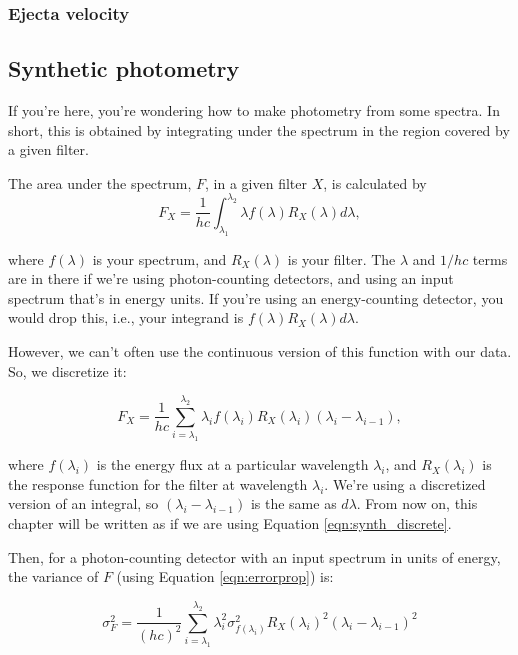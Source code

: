 \subsubsection{Ejecta velocity}
\label{sec:ejectavelocity}

\subsection{Synthetic photometry}

If you're here, you're wondering how to make photometry from some spectra. In short, this is obtained by integrating under the spectrum in the region covered by a given filter. 

The area under the spectrum, $F$, in a given filter $X$, is calculated by
\begin{equation}
    F_{X} = \frac{1}{hc}\int_{\lambda_{1}}^{\lambda_{2}} \lambda f(\lambda) R_{X}(\lambda) d\lambda,
\label{eqn:synthint}
\end{equation}

where $f(\lambda)$ is your spectrum, and $R_{X}(\lambda)$ is your filter. The $\lambda$ and $1/hc$ terms are in there if we're using photon-counting detectors, and using an input spectrum that's in energy units. If you're using an energy-counting detector, you would drop this, i.e., your integrand is $f(\lambda) R_{X}(\lambda) d\lambda$.

However, we can't often use the continuous version of this function with our data. So, we discretize it:

\begin{equation}
    F_{X} = \frac{1}{hc}\sum_{i=\lambda_{1}}^{\lambda_{2}} \lambda_{i} f(\lambda_{i}) R_{X}(\lambda_{i})(\lambda_{i} - \lambda_{i-1}),
\label{eqn:synth_discrete}
\end{equation}

where $f(\lambda_{i})$ is the energy flux at a particular wavelength $\lambda_{i}$, and $R_{X}(\lambda_{i})$ is the response function for the filter at wavelength $\lambda_{i}$. We're using a discretized version of an integral, so $(\lambda_{i} - \lambda_{i-1})$ is the same as $d\lambda$. From now on, this chapter will be written as if we are using Equation \ref{eqn:synth_discrete}.

Then, for a photon-counting detector with an input spectrum in units of energy, the variance of $F$ (using Equation \ref{eqn:errorprop}) is:

\begin{equation}
\label{eqn:varphot}
    \sigma_{F}^{2} = \frac{1}{(hc)^{2}}\sum_{i=\lambda_{1}}^{\lambda_{2}} \lambda_{i}^{2}\sigma_{f(\lambda_{i})}^{2} R_{X}(\lambda_{i})^{2}(\lambda_{i} - \lambda_{i-1})^{2} 
\end{equation}

